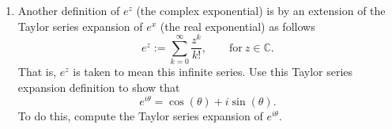 \begin{enumerate}
\item Another definition of $e^{z}$ (the complex exponential) is by an extension of the Taylor series expansion of $e^{x}$ (the real exponential) as follows
$$e^{z}:=\sum_{k=0}^{\infty}\frac{z^{k}}{k!}, \quad\quad \text{for}\ z\in\mathbb{C}.$$
That is, $e^{z}$ is taken to mean this infinite series. Use this Taylor series expansion definition to show that
\begin{equation}
  e^{i\theta} = \cos(\theta) + i\sin(\theta).
  \label{ch03:euler_formula}
\end{equation}
To do this, compute the Taylor series expansion of $e^{i\theta}$. 

\end{enumerate}